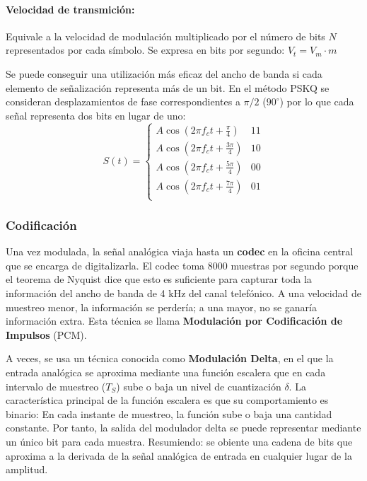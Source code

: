 \paragraph{Velocidad de transmición:} Equivale a la velocidad de modulación multiplicado por el número de bits \(N\) representados por cada símbolo. Se expresa en bits por segundo: \(V_t = V_m\cdot m\)

Se puede conseguir una utilización más eficaz del ancho de banda si cada elemento de señalización representa más de un bit.  En el método PSKQ  se consideran desplazamientos de fase correspondientes a \(\pi/2\) (\(90^\circ\)) por lo que cada señal representa dos bits en lugar de uno:
\[
  S(t) = \begin{cases}
    A\cos(2\pi f_c t + \frac{\pi}{4}) & \text{11} \\
    A\cos(2\pi f_c t + \frac{3\pi}{4}) & \text{10} \\
    A\cos(2\pi f_c t + \frac{5\pi}{4}) & \text{00} \\
    A\cos(2\pi f_c t + \frac{7\pi}{4}) & \text{01} \\
  \end{cases}
\]

\subsubsection{Codificación}
Una vez modulada, la señal analógica viaja hasta un \textbf{codec}  en la oficina central  que se encarga de digitalizarla. El codec toma 8000 muestras por segundo porque el teorema de Nyquist dice que esto es suficiente para capturar toda la información del ancho de banda de 4 kHz del canal telefónico. A una velocidad de muestreo menor, la información se perdería; a una mayor, no se ganaría información extra. Esta técnica se llama \textbf{Modulación por Codificación de Impulsos} (PCM).   

A veces, se usa un técnica conocida como \textbf{Modulación Delta}, en el que la entrada analógica se aproxima mediante una función escalera que en cada intervalo de muestreo (\(T_S\)) sube o baja un nivel de cuantización \(\delta\). La característica principal de la función escalera es que su comportamiento es binario: En cada instante de muestreo, la función sube o baja una cantidad constante. Por tanto, la salida del modulador delta se puede representar mediante un único bit para cada muestra. Resumiendo: se obiente una cadena de bits que aproxima a la derivada de la señal analógica de entrada en cualquier lugar de la amplitud.

